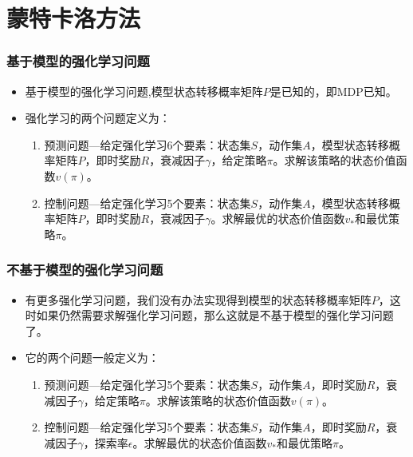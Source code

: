 \section{蒙特卡洛方法}

\begin{frame}
  \frametitle{基于模型的强化学习问题}
  \begin{itemize}
    \item 基于模型的强化学习问题,模型状态转移概率矩阵$P$是已知的，即MDP已知。
    \item 强化学习的两个问题定义为：
    \begin{enumerate}
      \item 预测问题---给定强化学习6个要素：状态集$S$，动作集$A$，模型状态转移概率矩阵$P$，即时奖励$R$，衰减因子$\gamma$，给定策略$\pi$。求解该策略的状态价值函数$v(\pi)$。
      \item 控制问题---给定强化学习5个要素：状态集$S$，动作集$A$，模型状态转移概率矩阵$P$，即时奖励$R$，衰减因子$\gamma$。求解最优的状态价值函数$v_*$和最优策略$\pi$。
    \end{enumerate}
    
  \end{itemize}
\end{frame}

\begin{frame}
  \frametitle{不基于模型的强化学习问题}
  \begin{itemize}
    \item 有更多强化学习问题，我们没有办法实现得到模型的状态转移概率矩阵$P$，这时如果仍然需要求解强化学习问题，那么这就是不基于模型的强化学习问题了。
    \item 它的两个问题一般定义为：
    \begin{enumerate}
      \item 预测问题---给定强化学习5个要素：状态集$S$，动作集$A$，即时奖励$R$，衰减因子$\gamma$，给定策略$\pi$。求解该策略的状态价值函数$v(\pi)$。
      \item 控制问题---给定强化学习5个要素：状态集$S$，动作集$A$，即时奖励$R$，衰减因子$\gamma$，探索率$\epsilon$。求解最优的状态价值函数$v_*$和最优策略$\pi$。
    \end{enumerate}
  \end{itemize}
\end{frame}